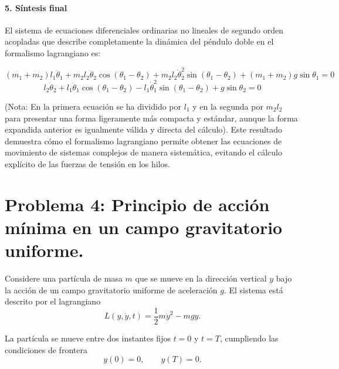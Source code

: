 \documentclass[a4paper]{article}
\begin{document}
\paragraph{5. Síntesis final}
El sistema de ecuaciones diferenciales ordinarias no lineales de segundo orden acopladas que describe completamente la dinámica del péndulo doble en el formalismo lagrangiano es:

$$(m_1 + m_2) l_1 \ddot{\theta}_1 + m_2 l_2 \ddot{\theta}_2 \cos(\theta_1 - \theta_2) + m_2 l_2 \dot{\theta}_2^2 \sin(\theta_1 - \theta_2) + (m_1 + m_2) g \sin\theta_1 = 0$$
$$l_2 \ddot{\theta}_2 + l_1 \ddot{\theta}_1 \cos(\theta_1 - \theta_2) - l_1 \dot{\theta}_1^2 \sin(\theta_1 - \theta_2) + g \sin\theta_2 = 0$$

(Nota: En la primera ecuación se ha dividido por $l_1$ y en la segunda por $m_2 l_2$ para presentar una forma ligeramente más compacta y estándar, aunque la forma expandida anterior es igualmente válida y directa del cálculo). Este resultado demuestra cómo el formalismo lagrangiano permite obtener las ecuaciones de movimiento de sistemas complejos de manera sistemática, evitando el cálculo explícito de las fuerzas de tensión en los hilos.


\section{Problema 4: Principio de acción mínima en un campo gravitatorio uniforme.}

Considere una partícula de masa $m$ que se mueve en la dirección vertical $y$ bajo la acción de un campo gravitatorio uniforme de aceleración $g$. El sistema está descrito por el lagrangiano
$$L(y, \dot{y}, t) = \frac{1}{2}m\dot{y}^2 - mgy.$$

La partícula se mueve entre dos instantes fijos $t = 0$ y $t = T$, cumpliendo las condiciones de frontera
$$y(0) = 0, \qquad y(T) = 0.$$
\end{document}
